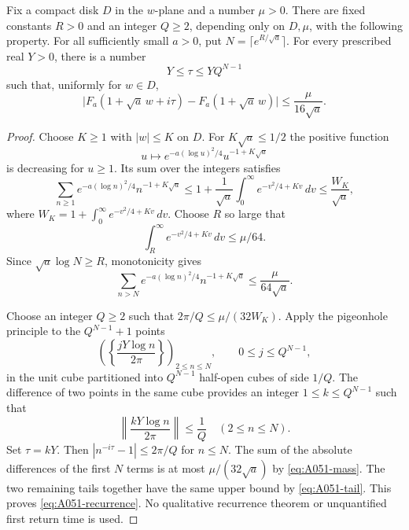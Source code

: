 \begin{lemma}
\label{lem:A051-recurrence}
Fix a compact disk \(D\) in the \(w\)-plane and a number \(\mu>0\).
There are fixed constants \(R>0\) and an integer \(Q\ge2\), depending
only on \(D,\mu\), with the following property.
For all sufficiently small \(a>0\), put
\(N=\lceil e^{R/\sqrt a}\rceil\).
For every prescribed real \(Y>0\), there is a number
\[
       Y\le\tau\le YQ^{N-1}
\]
such that, uniformly for \(w\in D\),
\begin{equation}\label{eq:A051-recurrence}
 \big|F_a(1+\sqrt a\,w+i\tau)
          -F_a(1+\sqrt a\,w)\big|
                    \le\frac{\mu}{16\sqrt a}.
\end{equation}
\end{lemma}

\begin{proof}
Choose \(K\ge1\) with \(|w|\le K\) on \(D\).
For \(K\sqrt a\le1/2\) the positive function
\[
        u\longmapsto
        e^{-a(\log u)^2/4}u^{-1+K\sqrt a}
\]
is decreasing for \(u\ge1\). Its sum over the integers satisfies
\begin{equation}\label{eq:A051-mass}
 \sum_{n\ge1}e^{-a(\log n)^2/4}n^{-1+K\sqrt a}
 \le1+\frac1{\sqrt a}\int_0^\infty e^{-v^2/4+Kv}\,dv
 \le\frac{W_K}{\sqrt a},
\end{equation}
where
\(W_K=1+\int_0^\infty e^{-v^2/4+Kv}\,dv\).
Choose \(R\) so large that
\[
             \int_R^\infty e^{-v^2/4+Kv}\,dv\le\mu/64.
\]
Since \(\sqrt a\log N\ge R\), monotonicity gives
\begin{equation}\label{eq:A051-tail}
 \sum_{n>N}e^{-a(\log n)^2/4}n^{-1+K\sqrt a}
                              \le\frac\mu{64\sqrt a}.
\end{equation}

Choose an integer \(Q\ge2\) such that
\(2\pi/Q\le\mu/(32W_K)\).
Apply the pigeonhole principle to the \(Q^{N-1}+1\) points
\[
 \left(\left\{\frac{jY\log n}{2\pi}\right\}\right)_{2\le n\le N},
                 \qquad 0\le j\le Q^{N-1},
\]
in the unit cube partitioned into \(Q^{N-1}\) half-open cubes
of side \(1/Q\). The difference of two points in the same cube
provides an integer \(1\le k\le Q^{N-1}\) such that
\[
       \left\|\frac{kY\log n}{2\pi}\right\|\le\frac1Q
                   \quad(2\le n\le N).
\]
Set \(\tau=kY\). Then
\(\left|n^{-i\tau}-1\right|\le2\pi/Q\) for \(n\le N\).
The sum of the absolute differences of the first \(N\) terms is
at most \(\mu/(32\sqrt a)\) by \eqref{eq:A051-mass}.
The two remaining tails together have the same upper bound by
\eqref{eq:A051-tail}. This proves \eqref{eq:A051-recurrence}.
No qualitative recurrence theorem or unquantified first return
time is used.
\end{proof}

